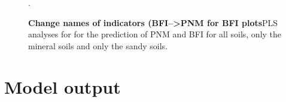 \documentclass[10pt,twoside,dutch,english]{report}
\begin{document}
\begin{appendices}
\begin{figure}
  \label{fig:pls_minbfi}
  \quad
{}
  \label{fig:pls_sanpnm}
    \quad
{}
  \label{fig:pls_sanbfi}
  \quad
\caption{\textbf{Change names of indicators (BFI-->PNM for BFI plots}PLS analyses for for the prediction of PNM and BFI for all soils, only the mineral soils and only the sandy soils.}. 
\label{fig:results_pls}		
\end{figure}

\linespread{1.3}

\chapter{Model output}
\label{chap:Model output}

  

  

\end{appendices}
\end{document}

